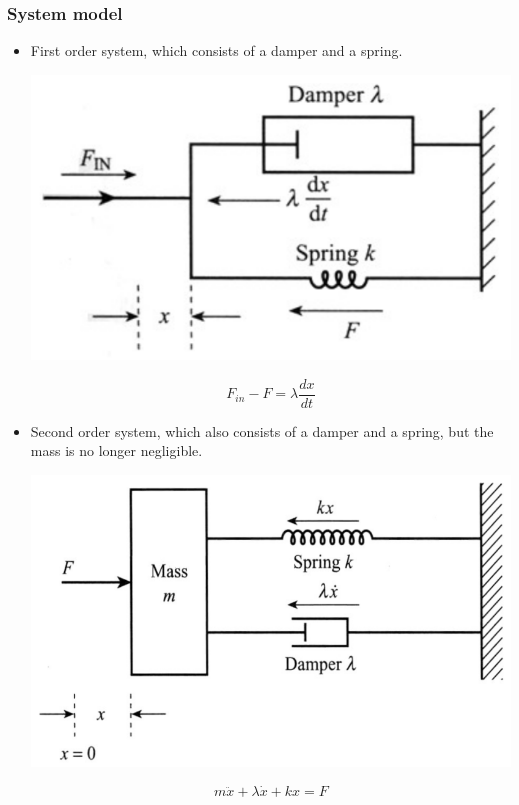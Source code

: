 \documentclass[11pt]{article}
\begin{document}
\subsubsection{System model}
\label{sec:org0b063bd}
\begin{itemize}
\item First order system, which consists of a damper and a spring.
\begin{center}
\includegraphics[width=.9\linewidth]{./images/first-order-system-diagram.png}
\end{center}
\[F_{in} - F = \lambda \frac{dx}{dt}\]

\item Second order system, which also consists of a damper and a spring, but the mass is no longer negligible.
\begin{center}
\includegraphics[width=.9\linewidth]{./images/second-order-system-diagram.png}
\end{center}
\[m \ddot{x} + \lambda \dot{x} + kx = F\]
\end{itemize}
\end{document}
